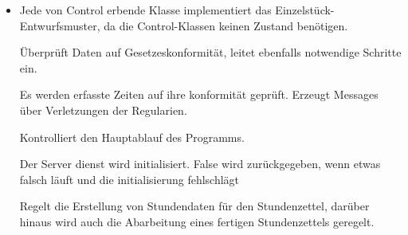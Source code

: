         \begin{itemize}
            \item Jede von Control erbende Klasse implementiert das Einzelstück-Entwurfsmuster, da die Control-Klassen keinen Zustand benötigen.
                \begin{itemize}
                       Überprüft Daten auf Gesetzeskonformität, leitet ebenfalls notwendige Schritte ein.
                       \begin{itemize}
                            Es werden erfasste Zeiten auf ihre konformität geprüft.
                            Erzeugt Messages über Verletzungen der Regularien.
                       \end{itemize}

                        Kontrolliert den Hauptablauf des Programms.
                        \begin{itemize}
                                Der Server dienst wird initialisiert.
                                False wird zurückgegeben, wenn etwas falsch läuft und die initialisierung fehlschlägt
                        \end{itemize}

                        Regelt die Erstellung von Stundendaten für den Stundenzettel, darüber hinaus wird auch die Abarbeitung eines fertigen Stundenzettels geregelt.
                        \begin{itemize}
                        \end{itemize}


\end{itemize}
\end{itemize}

